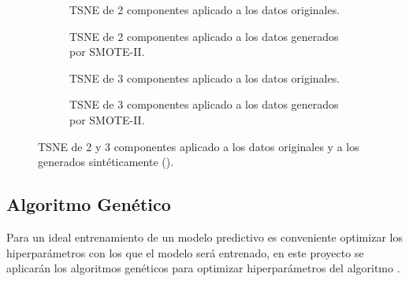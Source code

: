             \begin{figure}
                \centering
                \begin{subfigure}[b]{0.4\textwidth}
                    \centering
                    
                    \caption{TSNE de 2 componentes aplicado a los datos originales.}
                    \label{TSNEImages:Clean2D}
                \end{subfigure}
                \begin{subfigure}[b]{0.4\textwidth}
                    \centering
                    
                    \caption{TSNE de 2 componentes aplicado a los datos generados por SMOTE-II.}
                    \label{TSNEImages:Train2D}

                \end{subfigure}
                \begin{subfigure}[b]{0.4\textwidth}
                    \centering
                    
                    \caption{TSNE de 3 componentes aplicado a los datos originales.}
                    \label{TSNEImages:Clean3D}
                \end{subfigure}
                \begin{subfigure}[b]{0.4\textwidth}
                    \centering
                    
                    \caption{TSNE de 3 componentes aplicado a los datos generados por SMOTE-II.}
                    \label{TSNEImages:Train3D}
                \end{subfigure}
                \caption{TSNE de 2 y 3 componentes aplicado a los datos originales y a los generados sintéticamente ().}
                \label{TSNEImages}
             \end{figure}



    \subsection{Algoritmo Genético}


        Para un ideal entrenamiento de un modelo predictivo es conveniente optimizar los hiperparámetros con los que el modelo será entrenado, en este proyecto se aplicarán los algoritmos genéticos para optimizar hiperparámetros del algoritmo .\\

